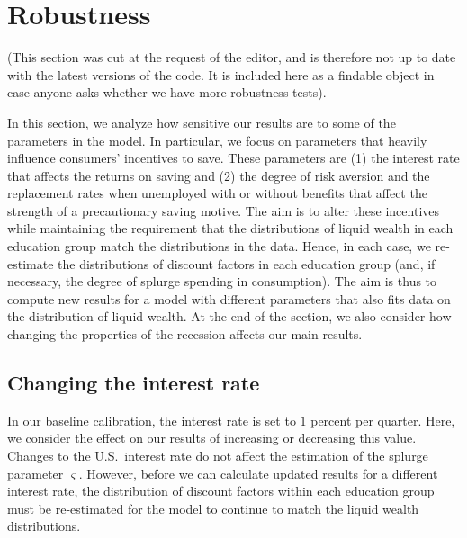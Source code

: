 \documentclass[\latexroot/\projectname]{subfiles}
\begin{document}
\FloatBarrier
\hypertarget{robustness}{}

\section*{Robustness}
\whenintegrated{\label{sec:robustness}} %

(This section was cut at the request of the editor, and is therefore not up to date with the latest versions of the code.  It is included here as a findable object in case anyone asks whether we have more robustness tests).

In this section, we analyze how sensitive our results are to some of the parameters in the model. In particular, we focus on parameters that heavily influence consumers' incentives to save. These parameters are (1) the interest rate that affects the returns on saving and (2) the degree of risk aversion and the replacement rates when unemployed with or without benefits that affect the strength of a precautionary saving motive. The aim is to alter these incentives while maintaining the requirement that the distributions of liquid wealth in each education group match the distributions in the data. Hence, in each case, we re-estimate the distributions of discount factors in each education group (and, if necessary, the degree of splurge spending in consumption). The aim is thus to compute new results for a model with different parameters that also fits data on the distribution of liquid wealth. At the end of the section, we also consider how changing the properties of the recession affects our main results.

\hypertarget{changing-the-interest-rate}{}\par\subsection*{Changing the interest rate}
\whenintegrated{\label{sec:robust_R}} %
In our baseline calibration, the interest rate is set to $1$ percent per quarter. Here, we consider the effect on our results of increasing or decreasing this value. Changes to the U.S.\ interest rate do not affect the estimation of the splurge parameter $\varsigma$. However, before we can calculate updated results for a different interest rate, the distribution of discount factors within each education group must be re-estimated for the model to continue to match the liquid wealth distributions.
\end{document}
